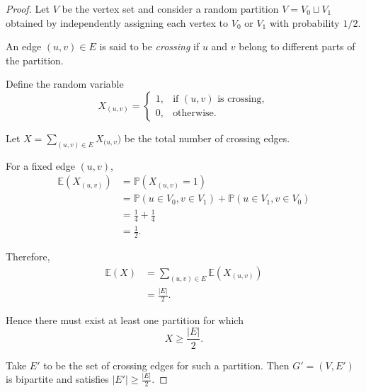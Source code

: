 \begin{proof}

Let $V$ be the vertex set and consider a random partition
\(
V=V_0\sqcup V_1
\)
obtained by independently assigning each vertex to $V_0$ or $V_1$ with
probability $1/2$.

An edge $(u,v)\in E$ is said to be \emph{crossing} if $u$ and $v$
belong to different parts of the partition.

Define the random variable
\[
X_{(u,v)}
=
\begin{cases}
1, & \text{if $(u,v)$ is crossing},\\
0, & \text{otherwise}.
\end{cases}
\]

Let
\(
X
=
\sum_{(u,v)\in E}
X_{(u,v})
\)
be the total number of crossing edges.

For a fixed edge $(u,v)$,
\[
\begin{aligned}
\mathbb{E}(X_{(u,v)})
&=
\mathbb{P}(X_{(u,v)}=1)\\
&=
\mathbb{P}(u\in V_0,v\in V_1)
+
\mathbb{P}(u\in V_1,v\in V_0)\\
&=
\frac14+\frac14\\
&=
\frac12.
\end{aligned}
\]

Therefore,
\[
\begin{aligned}
\mathbb{E}(X)
&=
\sum_{(u,v)\in E}
\mathbb{E}(X_{(u,v)})\\
&=
\frac{|E|}{2}.
\end{aligned}
\]

Hence there must exist at least one partition for which
\[
X\geq\frac{|E|}{2}.
\]

Take $E'$ to be the set of crossing edges for such a partition.
Then
\(
G'=(V,E')
\)
is bipartite and satisfies
\(
|E'|\geq\frac{|E|}{2}.
\)

\end{proof}



\lectureend

